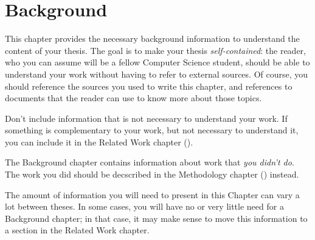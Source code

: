 \chapter{Background}
\label{ch:background}

This chapter provides the necessary background information to understand the content of your thesis.
The goal is to make your thesis \emph{self-contained}: the reader, who you can assume will be
a fellow Computer Science student, should be able to understand your work without having to refer
to external sources. Of course, you should reference the sources you used to write this chapter, and references to documents that the reader can use to know more about those topics.

Don't include information that is not necessary to understand your work. If something is
complementary to your work, but not necessary to understand it, you can include it in the
Related Work chapter ().

The Background chapter contains information about work that \emph{you didn't do}. The work you
did should be decscribed in the Methodology chapter () instead.

The amount of information you will need to present in this Chapter can vary a lot between theses.
In some cases, you will have no or very little need for a Background chapter; in that case, it
may make sense to move this information to a section in the Related Work chapter.
